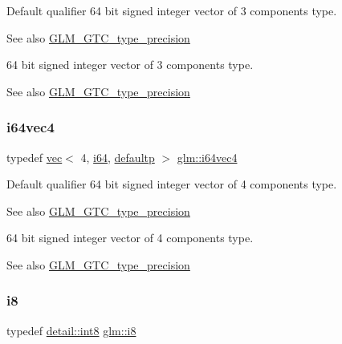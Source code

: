 Default qualifier 64 bit signed integer vector of 3 components type. \begin{DoxySeeAlso}{See also}
\hyperlink{group__gtc__type__precision}{G\+L\+M\+\_\+\+G\+T\+C\+\_\+type\+\_\+precision}
\end{DoxySeeAlso}
64 bit signed integer vector of 3 components type. \begin{DoxySeeAlso}{See also}
\hyperlink{group__gtc__type__precision}{G\+L\+M\+\_\+\+G\+T\+C\+\_\+type\+\_\+precision} 
\end{DoxySeeAlso}
\mbox{\label{group__gtc__type__precision_ga77db970d924dd55ac93e00391ad4a10e}} 
\subsubsection{\texorpdfstring{i64vec4}{i64vec4}}
{\footnotesize\ttfamily typedef \hyperlink{structglm_1_1vec}{vec}$<$ 4, \hyperlink{group__gtc__type__precision_gac7a7eaad46064fc952b06df33689da23}{i64}, \hyperlink{namespaceglm_a36ed105b07c7746804d7fdc7cc90ff25a9d21ccd8b5a009ec7eb7677befc3bf51}{defaultp} $>$ \hyperlink{group__gtc__type__precision_ga77db970d924dd55ac93e00391ad4a10e}{glm\+::i64vec4}}

Default qualifier 64 bit signed integer vector of 4 components type. \begin{DoxySeeAlso}{See also}
\hyperlink{group__gtc__type__precision}{G\+L\+M\+\_\+\+G\+T\+C\+\_\+type\+\_\+precision}
\end{DoxySeeAlso}
64 bit signed integer vector of 4 components type. \begin{DoxySeeAlso}{See also}
\hyperlink{group__gtc__type__precision}{G\+L\+M\+\_\+\+G\+T\+C\+\_\+type\+\_\+precision} 
\end{DoxySeeAlso}
\mbox{\label{group__gtc__type__precision_gaae064be68b7d36cd7910c16e8ad18bba}} 
\subsubsection{\texorpdfstring{i8}{i8}}
{\footnotesize\ttfamily typedef \hyperlink{namespaceglm_1_1detail_a04b526a8d7a9b455602a0afa78c531e0}{detail\+::int8} \hyperlink{group__gtc__type__precision_gaae064be68b7d36cd7910c16e8ad18bba}{glm\+::i8}}

